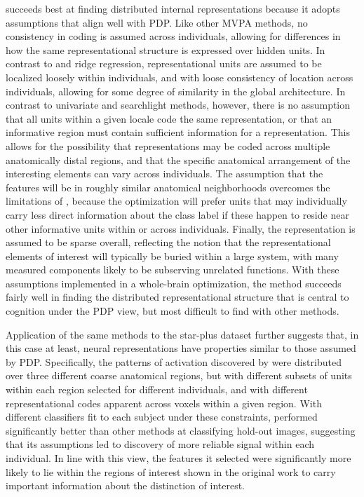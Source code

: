 {\soslasso} succeeds best at finding distributed internal representations because it adopts assumptions that align well with PDP. Like other MVPA methods, no consistency in coding is assumed across individuals, allowing for differences in how the same representational structure is expressed over hidden units. In contrast to {\lasso} and ridge regression, representational units are assumed to be localized loosely within individuals, and with loose consistency of location across individuals, allowing for some degree of similarity in the global architecture. In contrast to univariate and searchlight methods, however, there is no assumption that all units within a given locale code the same representation, or that an informative region must contain sufficient information for a representation. This allows for the possibility that representations may be coded across multiple anatomically distal regions, and that the specific anatomical arrangement of the interesting elements can vary across individuals. The assumption that the features will be in roughly similar anatomical neighborhoods overcomes the limitations of {\lasso}, because the optimization will prefer units that may individually carry less direct information about the class label if these happen to reside near other informative units within or across individuals. Finally, the representation is assumed to be sparse overall, reflecting the notion that the representational elements of interest will typically be buried within a large system, with many measured components likely to be subserving unrelated functions. With these assumptions implemented in a whole-brain optimization, the method succeeds fairly well in finding the distributed representational structure that is central to cognition under the PDP view, but most difficult to find with other methods. 

Application of the same methods to the star-plus dataset further suggests that, in this case at least, neural representations have properties similar to those assumed by PDP. Specifically, the patterns of activation discovered by {\soslasso} were distributed over three different coarse anatomical regions, but with different subsets of units within each region selected for different individuals, and with different representational codes apparent across voxels within a given region. With different classifiers fit to each subject under these constraints, {\soslasso} performed significantly better than other methods at classifying hold-out images, suggesting that its assumptions led to discovery of more reliable signal within each individual. In line with this view, the features it selected were significantly more likely to lie within the regions of interest shown in the original work to carry important information about the distinction of interest.  

